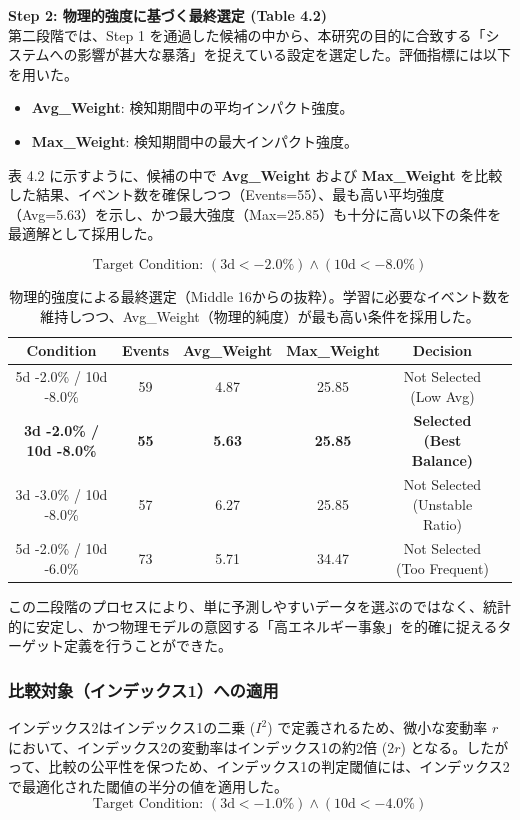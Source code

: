 \documentclass[11pt,a4paper,oneside]{ltjsarticle}
\begin{document}
\textbf{Step 2: 物理的強度に基づく最終選定 (Table 4.2)} \\
第二段階では、Step 1 を通過した候補の中から、本研究の目的に合致する「システムへの影響が甚大な暴落」を捉えている設定を選定した。評価指標には以下を用いた。
\begin{itemize}
    \item \textbf{Avg\_Weight}: 検知期間中の平均インパクト強度。
    \item \textbf{Max\_Weight}: 検知期間中の最大インパクト強度。
\end{itemize}
表 4.2 に示すように、候補の中で \textbf{Avg\_Weight} および \textbf{Max\_Weight} を比較した結果、イベント数を確保しつつ（Events=55）、最も高い平均強度（Avg=5.63）を示し、かつ最大強度（Max=25.85）も十分に高い以下の条件を最適解として採用した。

\begin{equation}
\text{Target Condition: } (3\text{d} < -2.0\%) \land (10\text{d} < -8.0\%)
\end{equation}

\begin{table}[H]
\centering
\caption{物理的強度による最終選定（Middle 16からの抜粋）。学習に必要なイベント数を維持しつつ、Avg\_Weight（物理的純度）が最も高い条件を採用した。}
\label{tab:grid_step2}
\small
\begin{tabular}{cccccc}
\hline
Condition & Events & Avg\_Weight & Max\_Weight & Decision \\
\hline
5d -2.0\% / 10d -8.0\% & 59 & 4.87 & 25.85 & Not Selected (Low Avg) \\
\textbf{3d -2.0\% / 10d -8.0\%} & \textbf{55} & \textbf{5.63} & \textbf{25.85} & \textbf{Selected (Best Balance)} \\
3d -3.0\% / 10d -8.0\% & 57 & 6.27 & 25.85 & Not Selected (Unstable Ratio) \\
5d -2.0\% / 10d -6.0\% & 73 & 5.71 & 34.47 & Not Selected (Too Frequent) \\
\hline
\end{tabular}
\end{table}

この二段階のプロセスにより、単に予測しやすいデータを選ぶのではなく、統計的に安定し、かつ物理モデルの意図する「高エネルギー事象」を的確に捉えるターゲット定義を行うことができた。

\subsubsection{比較対象（インデックス1）への適用}
インデックス2はインデックス1の二乗 ($I^2$) で定義されるため、微小な変動率 $r$ において、インデックス2の変動率はインデックス1の約2倍 ($2r$) となる。したがって、比較の公平性を保つため、インデックス1の判定閾値には、インデックス2で最適化された閾値の半分の値を適用した。
\begin{equation}
\text{Target Condition: } (3\text{d} < -1.0\%) \land (10\text{d} < -4.0\%)
\end{equation}
\end{document}
